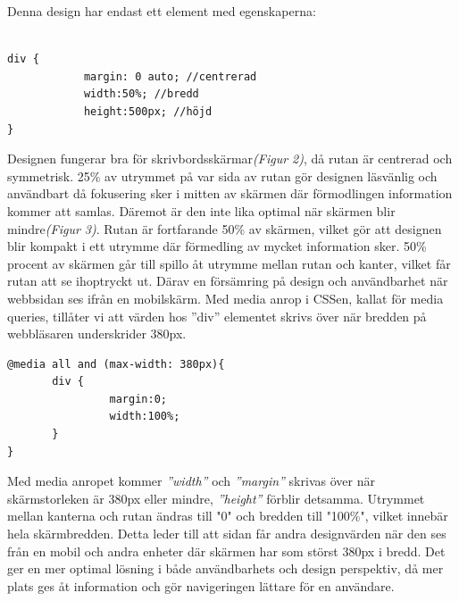 \documentclass[11pt]{article}
\begin{document}
\vspace{1cm}
Denna design har endast ett element med egenskaperna:

\vspace{0.3cm}
\begin{verbatim}

div {	
	        margin: 0 auto; //centrerad
	        width:50%; //bredd
	        height:500px; //höjd
}
\end{verbatim}
\vspace{0.3cm}
Designen fungerar bra för skrivbordsskärmar\textit{(Figur 2)}, då rutan är centrerad och symmetrisk. 25\% av utrymmet på var sida av rutan gör designen läsvänlig och användbart då fokusering sker i mitten av skärmen där förmodlingen information kommer att samlas. Däremot är den inte lika optimal när skärmen blir mindre\textit{(Figur 3)}. Rutan är fortfarande 50\% av skärmen, vilket gör att  designen blir kompakt i ett utrymme där förmedling av mycket information sker. 50\% procent av skärmen går till spillo åt utrymme mellan rutan och kanter, vilket får rutan att se ihoptryckt ut. Därav en försämring på design och användbarhet när webbsidan ses ifrån en mobilskärm.
\newpage
Med media anrop i CSSen, kallat för media queries, tillåter vi att värden hos ”div” elementet skrivs över när bredden på webbläsaren underskrider 380px.

\vspace{0.5cm}
\begin{verbatim}
@media all and (max-width: 380px){
       div {
                margin:0;
                width:100%;
       }
}
\end{verbatim}
\vspace{0.5cm}

Med media anropet kommer \textit{”width”} och \textit{”margin”} skrivas över när skärmstorleken är 380px eller mindre, \textit{”height”} förblir detsamma. Utrymmet mellan kanterna och rutan ändras till "0" och bredden till "100\%", vilket innebär hela skärmbredden. Detta leder till att sidan får andra designvärden när den ses från en mobil och andra enheter där skärmen har som störst 380px i bredd. Det ger en mer optimal lösning i både användbarhets och design perspektiv, då mer plats ges åt information och gör navigeringen lättare för en användare.
\end{document}
